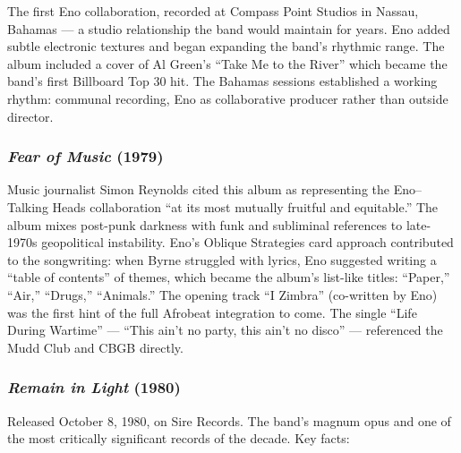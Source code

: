 \documentclass[11pt,letterpaper]{article}
\begin{document}
The first Eno collaboration, recorded at Compass Point Studios in Nassau, Bahamas --- a studio relationship the band would maintain for years. Eno added subtle electronic textures and began expanding the band's rhythmic range. The album included a cover of Al Green's ``Take Me to the River'' which became the band's first Billboard Top 30 hit. The Bahamas sessions established a working rhythm: communal recording, Eno as collaborative producer rather than outside director.

\subsubsection{\textit{Fear of Music} (1979)}

Music journalist Simon Reynolds cited this album as representing the Eno--Talking Heads collaboration ``at its most mutually fruitful and equitable.'' The album mixes post-punk darkness with funk and subliminal references to late-1970s geopolitical instability. Eno's Oblique Strategies card approach contributed to the songwriting: when Byrne struggled with lyrics, Eno suggested writing a ``table of contents'' of themes, which became the album's list-like titles: ``Paper,'' ``Air,'' ``Drugs,'' ``Animals.'' The opening track ``I Zimbra'' (co-written by Eno) was the first hint of the full Afrobeat integration to come. The single ``Life During Wartime'' --- ``This ain't no party, this ain't no disco'' --- referenced the Mudd Club and CBGB directly.

\subsubsection{\textit{Remain in Light} (1980)}

Released October 8, 1980, on Sire Records. The band's magnum opus and one of the most critically significant records of the decade. Key facts:
\end{document}
